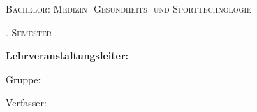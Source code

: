 
\begin{titlepage}
    \centering
    {\scshape\LARGE Bachelor: Medizin- Gesundheits- und Sporttechnologie \par}
    \vspace{1cm}
    {\scshape\Large \semester. Semester\par}
    \vspace{1.5cm}
    {\huge\bfseries \titel \par}
    \vspace{0.5cm}
    \vspace{2cm}
    {\Large\bfseries Lehrveranstaltungsleiter: \professor \par}
    \vfill
    {\Large Gruppe: \gruppe\par}
    \vfill
    {\Large Verfasser: \verfasser \par}
    \vspace{1cm}
    {\Large \datum\par}
\end{titlepage}

\newpage
{}
\tableofcontents
{}

\newpage
{}